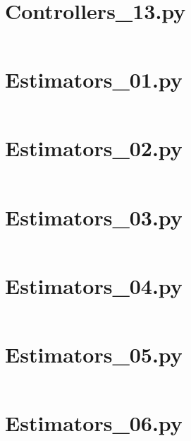 \pagebreak
\section*{Controllers\_13.py}\label{code:TSatPySamples/Controllers_13.py}\inputminted[linenos,fontsize=\scriptsize]{python}{/home/dcouture/git/mathyourlife/TSatPy/tex/sample_scripts/Controllers_13.py}

\pagebreak
\section*{Estimators\_01.py}\label{code:TSatPySamples/Estimators_01.py}\inputminted[linenos,fontsize=\scriptsize]{python}{/home/dcouture/git/mathyourlife/TSatPy/tex/sample_scripts/Estimators_01.py}

\pagebreak
\section*{Estimators\_02.py}\label{code:TSatPySamples/Estimators_02.py}\inputminted[linenos,fontsize=\scriptsize]{python}{/home/dcouture/git/mathyourlife/TSatPy/tex/sample_scripts/Estimators_02.py}

\pagebreak
\section*{Estimators\_03.py}\label{code:TSatPySamples/Estimators_03.py}\inputminted[linenos,fontsize=\scriptsize]{python}{/home/dcouture/git/mathyourlife/TSatPy/tex/sample_scripts/Estimators_03.py}

\pagebreak
\section*{Estimators\_04.py}\label{code:TSatPySamples/Estimators_04.py}\inputminted[linenos,fontsize=\scriptsize]{python}{/home/dcouture/git/mathyourlife/TSatPy/tex/sample_scripts/Estimators_04.py}

\pagebreak
\section*{Estimators\_05.py}\label{code:TSatPySamples/Estimators_05.py}\inputminted[linenos,fontsize=\scriptsize]{python}{/home/dcouture/git/mathyourlife/TSatPy/tex/sample_scripts/Estimators_05.py}

\pagebreak
\section*{Estimators\_06.py}\label{code:TSatPySamples/Estimators_06.py}\inputminted[linenos,fontsize=\scriptsize]{python}{/home/dcouture/git/mathyourlife/TSatPy/tex/sample_scripts/Estimators_06.py}

